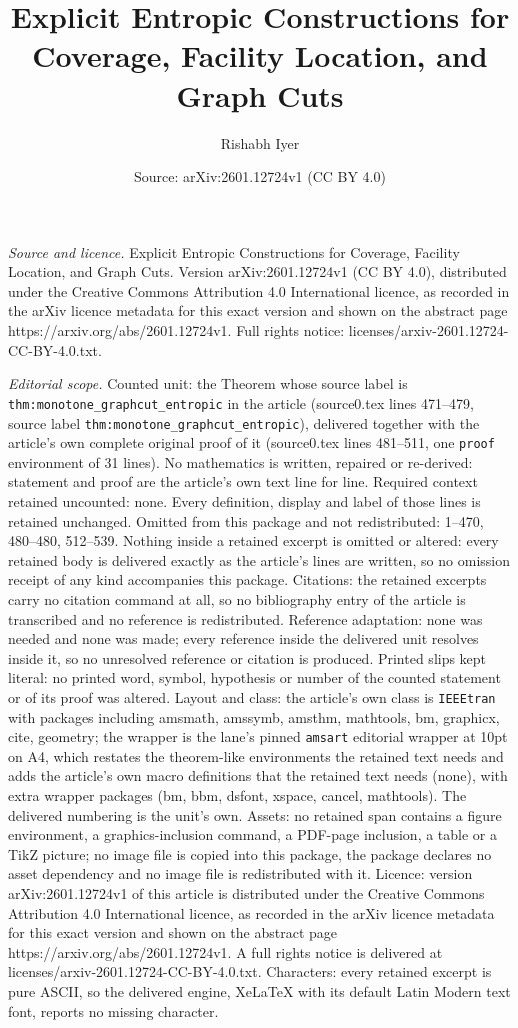 \documentclass[10pt,a4paper]{amsart}
\title[Explicit Entropic Constructions for Coverage, Facility Locat]{Explicit Entropic Constructions for Coverage, Facility Location, and Graph Cuts}
\author{Rishabh Iyer}
\date{Source: arXiv:2601.12724v1 (CC BY 4.0)}
\begin{document}
\maketitle

\noindent\emph{Source and licence.} Explicit Entropic Constructions for Coverage, Facility Location, and Graph Cuts. Version arXiv:2601.12724v1 (CC BY 4.0), distributed under the Creative Commons Attribution 4.0 International licence, as recorded in the arXiv licence metadata for this exact version and shown on the abstract page https://arxiv.org/abs/2601.12724v1. Full rights notice: licenses/arxiv-2601.12724-CC-BY-4.0.txt.\par\smallskip

\noindent\textit{Editorial scope.} Counted unit: the Theorem whose source label is \texttt{thm:monotone\_graphcut\_entropic} in the article (source0.tex lines 471--479, source label \texttt{thm:monotone\_graphcut\_entropic}), delivered together with the article's own complete original proof of it (source0.tex lines 481--511, one \texttt{proof} environment of 31 lines). No mathematics is written, repaired or re-derived: statement and proof are the article's own text line for line. Required context retained uncounted: none. Every definition, display and label of those lines is retained unchanged. Omitted from this package and not redistributed: 1--470, 480--480, 512--539. Nothing inside a retained excerpt is omitted or altered: every retained body is delivered exactly as the article's lines are written, so no omission receipt of any kind accompanies this package. Citations: the retained excerpts carry no citation command at all, so no bibliography entry of the article is transcribed and no reference is redistributed. Reference adaptation: none was needed and none was made; every reference inside the delivered unit resolves inside it, so no unresolved reference or citation is produced. Printed slips kept literal: no printed word, symbol, hypothesis or number of the counted statement or of its proof was altered. Layout and class: the article's own class is \texttt{IEEEtran} with packages including amsmath, amssymb, amsthm, mathtools, bm, graphicx, cite, geometry; the wrapper is the lane's pinned \texttt{amsart} editorial wrapper at 10pt on A4, which restates the theorem-like environments the retained text needs and adds the article's own macro definitions that the retained text needs (none), with extra wrapper packages (bm, bbm, dsfont, xspace, cancel, mathtools). The delivered numbering is the unit's own. Assets: no retained span contains a figure environment, a graphics-inclusion command, a PDF-page inclusion, a table or a TikZ picture; no image file is copied into this package, the package declares no asset dependency and no image file is redistributed with it. Licence: version arXiv:2601.12724v1 of this article is distributed under the Creative Commons Attribution 4.0 International licence, as recorded in the arXiv licence metadata for this exact version and shown on the abstract page https://arxiv.org/abs/2601.12724v1. A full rights notice is delivered at licenses/arxiv-2601.12724-CC-BY-4.0.txt. Characters: every retained excerpt is pure ASCII, so the delivered engine, XeLaTeX with its default Latin Modern text font, reports no missing character.
\end{document}

